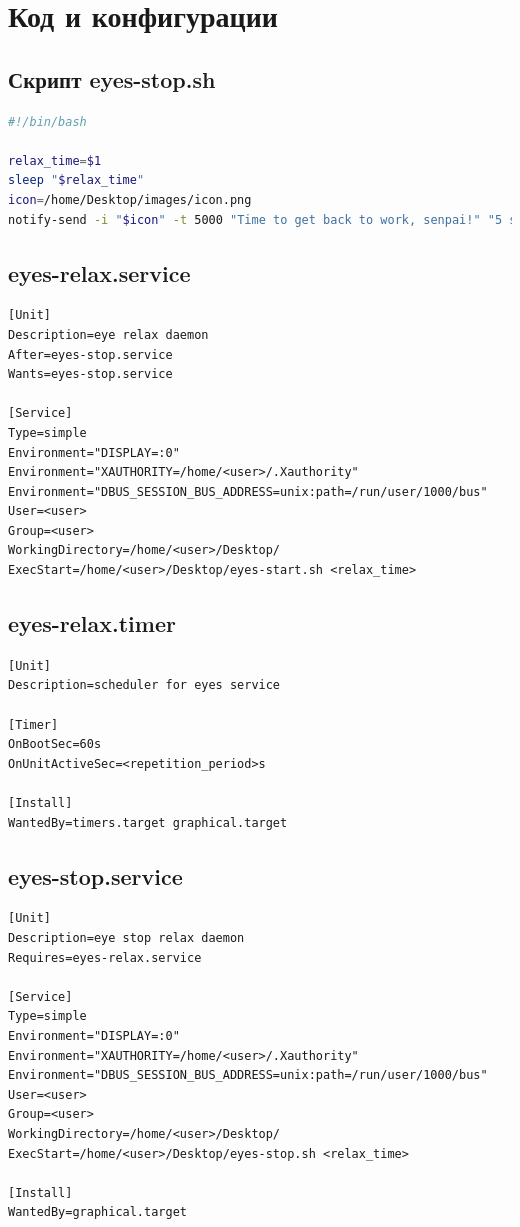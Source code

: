 \section{Код и конфигурации}
\subsection{Скрипт eyes-stop.sh}
\begin{lstlisting}[language=bash]
#!/bin/bash

relax_time=$1
sleep "$relax_time"
icon=/home/Desktop/images/icon.png
notify-send -i "$icon" -t 5000 "Time to get back to work, senpai!" "5 seconds"
\end{lstlisting}

\subsection{eyes-relax.service}
\begin{lstlisting}
[Unit]
Description=eye relax daemon
After=eyes-stop.service
Wants=eyes-stop.service

[Service]
Type=simple
Environment="DISPLAY=:0"
Environment="XAUTHORITY=/home/<user>/.Xauthority"
Environment="DBUS_SESSION_BUS_ADDRESS=unix:path=/run/user/1000/bus"
User=<user>
Group=<user>
WorkingDirectory=/home/<user>/Desktop/
ExecStart=/home/<user>/Desktop/eyes-start.sh <relax_time>
\end{lstlisting}

\subsection{eyes-relax.timer}
\begin{lstlisting}
[Unit]
Description=scheduler for eyes service

[Timer]
OnBootSec=60s
OnUnitActiveSec=<repetition_period>s

[Install]
WantedBy=timers.target graphical.target
\end{lstlisting}

\subsection{eyes-stop.service}
\begin{lstlisting}
[Unit]
Description=eye stop relax daemon
Requires=eyes-relax.service

[Service]
Type=simple
Environment="DISPLAY=:0"
Environment="XAUTHORITY=/home/<user>/.Xauthority"
Environment="DBUS_SESSION_BUS_ADDRESS=unix:path=/run/user/1000/bus"
User=<user>
Group=<user>
WorkingDirectory=/home/<user>/Desktop/
ExecStart=/home/<user>/Desktop/eyes-stop.sh <relax_time>

[Install]
WantedBy=graphical.target
\end{lstlisting}

